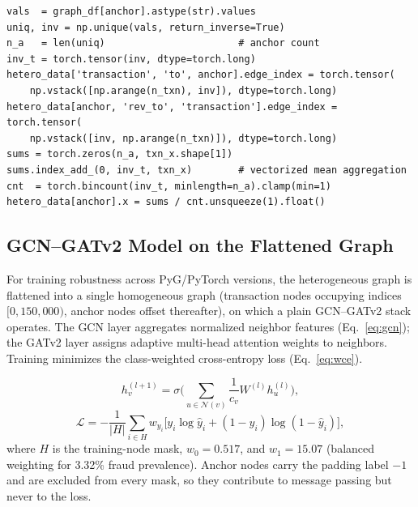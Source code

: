\documentclass[conference]{IEEEtran}
\begin{document}
\begin{lstlisting}[style=pystyle,
  caption={Vectorized anchor construction for one anchor type.},
  label={lst:graph}]
vals  = graph_df[anchor].astype(str).values
uniq, inv = np.unique(vals, return_inverse=True)
n_a   = len(uniq)                       # anchor count
inv_t = torch.tensor(inv, dtype=torch.long)
hetero_data['transaction', 'to', anchor].edge_index = torch.tensor(
    np.vstack([np.arange(n_txn), inv]), dtype=torch.long)
hetero_data[anchor, 'rev_to', 'transaction'].edge_index = torch.tensor(
    np.vstack([inv, np.arange(n_txn)]), dtype=torch.long)
sums = torch.zeros(n_a, txn_x.shape[1])
sums.index_add_(0, inv_t, txn_x)        # vectorized mean aggregation
cnt  = torch.bincount(inv_t, minlength=n_a).clamp(min=1)
hetero_data[anchor].x = sums / cnt.unsqueeze(1).float()
\end{lstlisting}

\subsection{GCN--GATv2 Model on the Flattened Graph}
For training robustness across PyG/PyTorch versions, the heterogeneous
graph is flattened into a single homogeneous graph (transaction nodes
occupying indices $[0, 150{,}000)$, anchor nodes offset thereafter), on
which a plain GCN--GATv2 stack operates. The GCN layer aggregates
normalized neighbor features (Eq.~\ref{eq:gcn}); the GATv2 layer assigns
adaptive multi-head attention weights to neighbors. Training minimizes the
class-weighted cross-entropy loss (Eq.~\ref{eq:wce}).

\begin{equation}
h_v^{(l+1)}=\sigma\Big(\sum_{u\in\mathcal{N}(v)}\frac{1}{c_v}W^{(l)}h_u^{(l)}\Big),
\label{eq:gcn}
\end{equation}
\begin{equation}
\mathcal{L}=-\frac{1}{|H|}\sum_{i\in H}w_{y_i}
\Big[y_i\log\hat{y}_i+(1-y_i)\log(1-\hat{y}_i)\Big],
\label{eq:wce}
\end{equation}
where $H$ is the training-node mask, $w_0=0.517$, and $w_1=15.07$ (balanced weighting for 3.32\% fraud prevalence). Anchor nodes carry the
padding label $-1$ and are excluded from every mask, so they contribute to
message passing but never to the loss.
\end{document}
